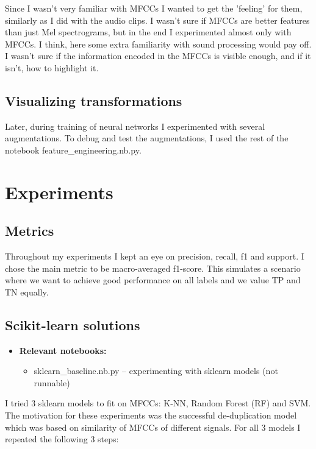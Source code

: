 \documentclass[11pt]{article}
\newcommand{\File}[1]{{\small\textsf{#1}}}
\begin{document}
Since I wasn't very familiar with MFCCs I wanted to get the 'feeling' for them,
similarly as I did with the audio clips. I wasn't sure if MFCCs are better
features than just Mel spectrograms, but in the end I experimented almost only
with MFCCs. I think, here some extra familiarity with sound processing would
pay off. I wasn't sure if the information encoded in the MFCCs is visible
enough, and if it isn't, how to highlight it.

\subsection{Visualizing transformations}

Later, during training of neural networks I experimented with several
augmentations. To debug and test the augmentations, I used the rest of the
notebook \File{feature\_engineering.nb.py}.

\section{Experiments}

\subsection{Metrics}

Throughout my experiments I kept an eye on precision, recall, f1 and support. I
chose the main metric to be macro-averaged f1-score. This simulates a scenario
where we want to achieve good performance on all labels and we value TP and TN
equally.

\subsection{Scikit-learn solutions}\label{section:sklearn_baselines}

\begin{itemize}
  \item[] \textbf{Relevant notebooks:}
    \begin{itemize}
      \item \File{sklearn\_baseline.nb.py} -- experimenting with sklearn models
        (not runnable)
    \end{itemize}
\end{itemize}

I tried 3 sklearn models to fit on MFCCs: K-NN, Random Forest (RF) and SVM. The
motivation for these experiments was the successful de-duplication model which
was based on similarity of MFCCs of different signals. For all 3 models I
repeated the following 3 steps:
\end{document}
